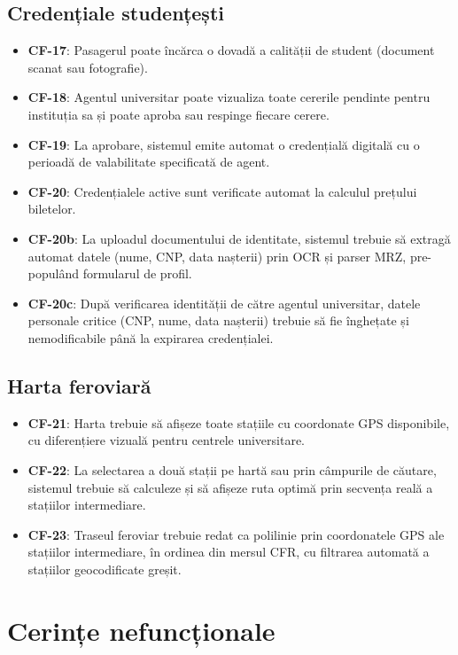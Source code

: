 \documentclass[12pt,a4paper]{report}
\begin{document}
\subsection{Credențiale studențești}

\begin{itemize}
  \item \textbf{CF-17}: Pasagerul poate încărca o dovadă a calității de student (document scanat sau fotografie).
  \item \textbf{CF-18}: Agentul universitar poate vizualiza toate cererile pendinte pentru instituția sa și poate aproba sau respinge fiecare cerere.
  \item \textbf{CF-19}: La aprobare, sistemul emite automat o credențială digitală cu o perioadă de valabilitate specificată de agent.
  \item \textbf{CF-20}: Credențialele active sunt verificate automat la calculul prețului biletelor.
  \item \textbf{CF-20b}: La uploadul documentului de identitate, sistemul trebuie să extragă automat datele (nume, CNP, data nașterii) prin OCR și parser MRZ, pre-populând formularul de profil.
  \item \textbf{CF-20c}: După verificarea identității de către agentul universitar, datele personale critice (CNP, nume, data nașterii) trebuie să fie înghețate și nemodificabile până la expirarea credențialei.
\end{itemize}

\subsection{Harta feroviară}

\begin{itemize}
  \item \textbf{CF-21}: Harta trebuie să afișeze toate stațiile cu coordonate GPS disponibile, cu diferențiere vizuală pentru centrele universitare.
  \item \textbf{CF-22}: La selectarea a două stații pe hartă sau prin câmpurile de căutare, sistemul trebuie să calculeze și să afișeze ruta optimă prin secvența reală a stațiilor intermediare.
  \item \textbf{CF-23}: Traseul feroviar trebuie redat ca polilinie prin coordonatele GPS ale stațiilor intermediare, în ordinea din mersul CFR, cu filtrarea automată a stațiilor geocodificate greșit.
\end{itemize}

\section{Cerințe nefuncționale}
\end{document}
